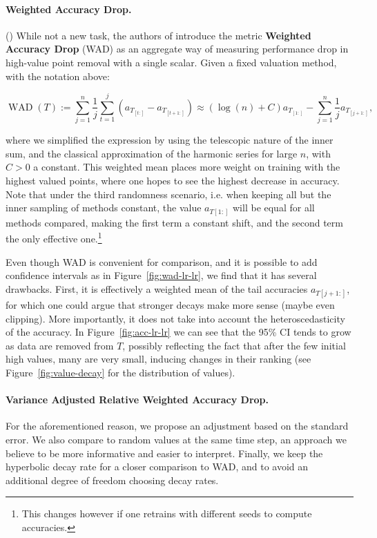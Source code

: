 \documentclass[10pt]{article}
\newcommand{\assign}{:=}
\newcommand{\tmdfn}[1]{\textbf{#1}}
\newcommand{\tmname}[1]{\textsc{#1}}
\newcommand{\tmop}[1]{\ensuremath{\operatorname{#1}}}
\begin{document}
\paragraph{Weighted Accuracy Drop.}() While not a new task, the
authors of {\cite{schoch_csshapley_2022}} introduce the metric
{\tmdfn{Weighted Accuracy Drop}} ({\tmname{WAD}}) as an aggregate way of
measuring performance drop in high-value point removal with a single scalar.
Given a fixed valuation method, with the notation above:

\begin{equation}
  \label{eq:wad} \tmop{WAD} (T) \assign \sum_{j = 1}^n \frac{1}{j}  \sum_{t =
  1}^j (a_{T_{[t :]}} - a_{T_{[t + 1 :]}}) \approx (\log (n) + C) a_{T_{[1
  :]}} - \sum_{j = 1}^n \frac{1}{j} a_{T_{[j + 1 :]}},
\end{equation}

where we simplified the expression by using the telescopic nature of the inner
sum, and the classical approximation of the harmonic series for large $n$,
with $C > 0$ a constant. This weighted mean places more weight on training
with the highest valued points, where one hopes to see the highest decrease in
accuracy. Note that under the third randomness scenario, i.e. when keeping all
but the inner sampling of methods constant, the value $a_{T [1 :]}$ will be
equal for all methods compared, making the first term a constant shift, and
the second term the only effective one.\footnote{This changes however if one
retrains with different seeds to compute accuracies.}

Even though WAD is convenient for comparison, and it is possible to add
confidence intervals as in  Figure~\ref{fig:wad-lr-lr}, we find that it has
several drawbacks. First, it is effectively a weighted mean of the tail
accuracies $a_{T [j + 1 :]}$, for which one could argue that stronger decays
make more sense (maybe even clipping). More importantly, it does not take into
account the heteroscedasticity of the accuracy. In  Figure~\ref{fig:acc-lr-lr}
we can see that the 95\% CI tends to grow as data are removed from $T$,
possibly reflecting the fact that after the few initial high values, many are
very small, inducing changes in their ranking (see 
Figure~\ref{fig:value-decay} for the distribution of values).

\paragraph{Variance Adjusted Relative Weighted Accuracy Drop.}For the
aforementioned reason, we propose an adjustment based on the standard error.
We also compare to random values at the same time step, an approach we believe
to be more informative and easier to interpret. Finally, we keep the
hyperbolic decay rate for a closer comparison to WAD, and to avoid an
additional degree of freedom choosing decay rates.
\end{document}
